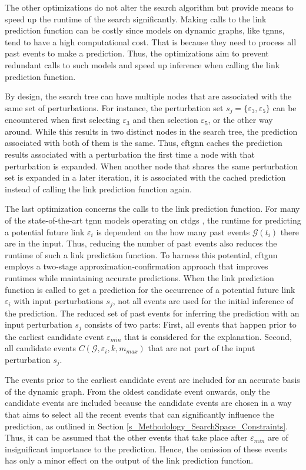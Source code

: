 The other optimizations do not alter the search algorithm but provide means to speed up the runtime of the search significantly. Making calls to the link prediction function can be costly since models on dynamic graphs, like \glspl{tgnn}, tend to have a high computational cost. That is because they need to process all past events to make a prediction. Thus, the optimizations aim to prevent redundant calls to such models and speed up inference when calling the link prediction function.

By design, the search tree can have multiple nodes that are associated with the same set of perturbations. For instance, the perturbation set $s_j = \{\varepsilon_3, \varepsilon_5\}$ can be encountered when first selecting $\varepsilon_3$ and then selection $\varepsilon_5$, or the other way around. While this results in two distinct nodes in the search tree, the prediction associated with both of them is the same. Thus, \gls{cftgnn} caches the prediction results associated with a perturbation the first time a node with that perturbation is expanded. When another node that shares the same perturbation set is expanded in a later iteration, it is associated with the cached prediction instead of calling the link prediction function again.

The last optimization concerns the calls to the link prediction function. For many of the state-of-the-art \gls{tgnn} models operating on \glspl{ctdg} \cite{rossi_temporal_2020, souza_provably_2022}, the runtime for predicting a potential future link $\varepsilon_i$ is dependent on the how many past events $\mathcal{G}(t_i)$ there are in the input. Thus, reducing the number of past events also reduces the runtime of such a link prediction function. To harness this potential, \gls{cftgnn} employs a two-stage approximation-confirmation approach that improves runtimes while maintaining accurate predictions. When the link prediction function is called to get a prediction for the occurrence of a potential future link $\varepsilon_i$ with input perturbations $s_j$, not all events are used for the initial inference of the prediction. The reduced set of past events for inferring the prediction with an input perturbation $s_j$ consists of two parts: First, all events that happen prior to the earliest candidate event $\varepsilon_{min}$ that is considered for the explanation. Second, all candidate events $C(\mathcal{G}, \varepsilon_i, k, m_{max})$ that are not part of the input perturbation $s_j$.

The events prior to the earliest candidate event are included for an accurate basis of the dynamic graph. From the oldest candidate event onwards, only the candidate events are included because the candidate events are chosen in a way that aims to select all the recent events that can significantly influence the prediction, as outlined in Section \ref{s_Methodology_SearchSpace_Constraints}. Thus, it can be assumed that the other events that take place after $\varepsilon_{min}$ are of insignificant importance to the prediction. Hence, the omission of these events has only a minor effect on the output of the link prediction function.

